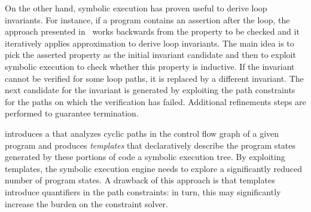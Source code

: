 On the other hand, symbolic execution has proven useful to derive loop invariants. For instance, if a program contains an assertion after the loop, the approach presented in~\cite{PV-SPIN04} works backwards from the property to be checked and it iteratively applies approximation to derive loop invariants. The main idea is to pick the asserted property as the initial invariant candidate and then to exploit symbolic execution to check whether this property is inductive. If the invariant cannot be verified for some loop paths, it is replaced by a different invariant. The next candidate for the invariant is generated by exploiting the path constraints for the paths on which the verification has failed. Additional refinements steps are performed to guarantee termination. %


\cite{SST-ATVA13} introduces a  that analyzes cyclic paths in the control flow graph of a given program and produces {\em templates} that declaratively describe the program states generated by these portions of code  a  symbolic execution tree. By exploiting templates, the symbolic execution engine needs to explore a significantly reduced number of program states. A drawback of this approach is that templates introduce quantifiers in the path constraints: in turn, this may significantly increase the burden on the constraint solver.

